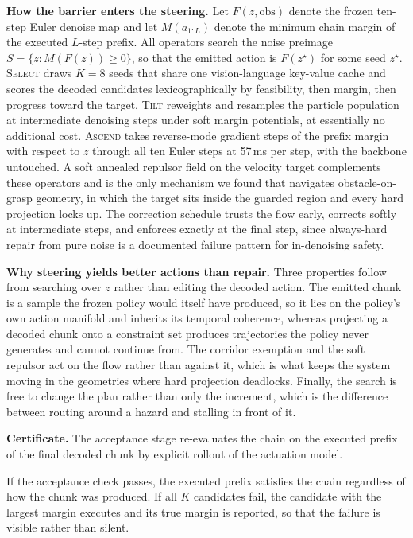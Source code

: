 \textbf{How the barrier enters the steering.} Let $F(z,\mathrm{obs})$ denote the
frozen ten-step Euler denoise map and let $M(a_{1:L})$ denote the minimum chain
margin of the executed $L$-step prefix. All operators search the noise preimage
$S=\{z:M(F(z))\ge0\}$, so that the emitted action is $F(z^\star)$ for some seed
$z^\star$. \textsc{Select} draws $K{=}8$ seeds that share one vision-language
key-value cache and scores the decoded candidates lexicographically by
feasibility, then margin, then progress toward the target. \textsc{Tilt}
reweights and resamples the particle population at intermediate denoising steps
under soft margin potentials, at essentially no additional cost. \textsc{Ascend}
takes reverse-mode gradient steps of the prefix margin with respect to $z$
through all ten Euler steps at 57\,ms per step, with the backbone untouched. A
soft annealed repulsor field on the velocity target complements these operators
and is the only mechanism we found that navigates obstacle-on-grasp geometry, in
which the target sits inside the guarded region and every hard projection locks
up. The correction schedule trusts the flow early, corrects softly at
intermediate steps, and enforces exactly at the final step, since always-hard
repair from pure noise is a documented failure pattern for in-denoising safety.

\textbf{Why steering yields better actions than repair.} Three properties follow
from searching over $z$ rather than editing the decoded action. The emitted
chunk is a sample the frozen policy would itself have produced, so it lies on
the policy's own action manifold and inherits its temporal coherence, whereas
projecting a decoded chunk onto a constraint set produces trajectories the
policy never generates and cannot continue from. The corridor exemption and the
soft repulsor act on the flow rather than against it, which is what keeps the
system moving in the geometries where hard projection deadlocks. Finally, the
search is free to change the plan rather than only the increment, which is the
difference between routing around a hazard and stalling in front of it.

\textbf{Certificate.} The acceptance stage re-evaluates the chain on the
executed prefix of the final decoded chunk by explicit rollout of the actuation
model.

\begin{proposition}\label{prop:cert}
If the acceptance check passes, the executed prefix satisfies the chain
regardless of how the chunk was produced. If all $K$ candidates fail, the
candidate with the largest margin executes and its true margin is reported, so
that the failure is visible rather than silent.
\end{proposition}

